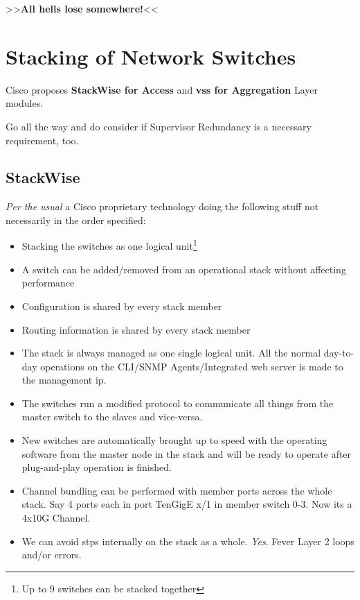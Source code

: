 \begin{center}
    \smallskip
    >>\hskip2mm\textbf{All hells lose somewhere!}\hskip2mm<<
\end{center}

\section[Stacking]{Stacking of {\footnotesize Network} Switches}

\begin{center}
    Cisco proposes \textbf{StackWise for Access} and \textbf{\gls{vss} for Aggregation} Layer modules.
\end{center}

Go all the way and do consider if Supervisor Redundancy is a necessary requirement, too.


\subsection{StackWise}

\textit{Per the usual} a Cisco proprietary technology doing the following stuff \footnotesize{not necessarily} in the order specified:
\begin{itemize}
    \item Stacking the switches as one logical unit\footnote{Up to 9 switches can be stacked together}
    \item A switch can be added/removed from an operational stack without affecting performance
    \item Configuration is shared by every stack member
    \item Routing information is shared by every stack member
    \item The stack is always managed as one single logical unit. All the normal day-to-day operations on the CLI/SNMP Agents/Integrated web server is made to the management \gls{ip}.
    \item The switches run a modified protocol to communicate all things from the master switch to the slaves and vice-versa.
    \item New switches are automatically brought up to speed with the operating software from the master node in the stack and will be ready to operate after plug-and-play operation is finished.
    \item Channel bundling can be performed with member ports across the whole stack. Say 4 ports each in port TenGigE x/1 in member switch 0-3. Now its a 4x10G Channel.
    \item We can avoid \glspl{stp} internally on the stack as a whole. \textit{Yes}. Fever Layer 2 loops and/or errors.
\end{itemize}

